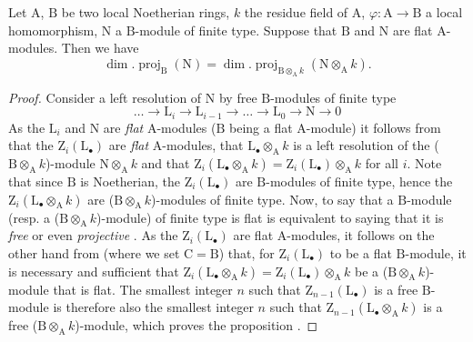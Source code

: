 \begin{proposition}[6.2.3]
\label{IV.6.2.3}
Let $\mathrm{A}$, $\mathrm{B}$ be two local Noetherian rings, $k$ the residue field of $\mathrm{A}$, $\varphi:\mathrm{A}\to\mathrm{B}$ a local homomorphism, $\mathrm{N}$ a $\mathrm{B}$-module of finite type.
Suppose that $\mathrm{B}$ and $\mathrm{N}$ are flat $\mathrm{A}$-modules.
Then we have
\begin{equation}
  \dim.\operatorname{proj}_\mathrm{B}(\mathrm{N})=\dim.\operatorname{proj}_{\mathrm{B}\otimes_\mathrm{A} k}(\mathrm{N}\otimes_\mathrm{A} k).
  \label{IV.6.2.3.1}
\tag{6.2.3.1}
\end{equation}
\end{proposition}

\begin{proof}
Consider a left resolution of $\mathrm{N}$ by free $\mathrm{B}$-modules of finite type
\[
  \ldots\to\mathrm{L}_i\to\mathrm{L}_{i-1}\to\ldots\to\mathrm{L}_0\to\mathrm{N}\to 0
\]
As the $\mathrm{L}_i$ and $\mathrm{N}$ are \emph{flat} $\mathrm{A}$-modules ($\mathrm{B}$ being a flat $\mathrm{A}$-module) it follows from  that the $\mathrm{Z}_i(\mathrm{L}_\bullet)$ are \emph{flat} $\mathrm{A}$-modules, that $\mathrm{L}_\bullet\otimes_\mathrm{A} k$ is a left resolution of the ($\mathrm{B}\otimes_\mathrm{A} k$)-module $\mathrm{N}\otimes_\mathrm{A} k$ and that $\mathrm{Z}_i(\mathrm{L}_\bullet\otimes_\mathrm{A} k)=\mathrm{Z}_i(\mathrm{L}_\bullet)\otimes_\mathrm{A} k$ for all $i$.
Note that since $\mathrm{B}$ is Noetherian, the $\mathrm{Z}_i(\mathrm{L}_\bullet)$ are $\mathrm{B}$-modules of finite type, hence the $\mathrm{Z}_i(\mathrm{L}_\bullet\otimes_\mathrm{A} k)$ are ($\mathrm{B}\otimes_\mathrm{A} k$)-modules of finite type.
Now, to say that a $\mathrm{B}$-module (resp. a ($\mathrm{B}\otimes_\mathrm{A} k$)-module) of finite type is flat is equivalent to saying that it is \emph{free} or even \emph{projective} .
As the $\mathrm{Z}_i(\mathrm{L}_\bullet)$ are flat $\mathrm{A}$-modules, it follows on the other hand from  (where we set $\mathrm{C}=\mathrm{B}$) that, for $\mathrm{Z}_i(\mathrm{L}_\bullet)$ to be a flat $\mathrm{B}$-module, it is necessary and sufficient that $\mathrm{Z}_i(\mathrm{L}_\bullet\otimes_\mathrm{A} k)=\mathrm{Z}_i(\mathrm{L}_\bullet)\otimes_\mathrm{A} k$ be a ($\mathrm{B}\otimes_\mathrm{A} k$)-module that is flat.
The smallest integer $n$ such that $\mathrm{Z}_{n-1}(\mathrm{L}_\bullet)$ is a free $\mathrm{B}$-module is therefore also the smallest integer $n$ such that $\mathrm{Z}_{n-1}(\mathrm{L}_\bullet\otimes_\mathrm{A} k)$ is a free ($\mathrm{B}\otimes_\mathrm{A} k$)-module, which proves the proposition .
\end{proof}

